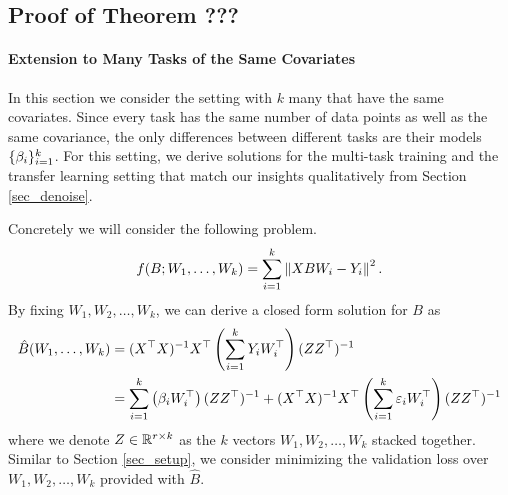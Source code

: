 \subsection{Proof of Theorem ???}

\paragraph{Extension to Many Tasks of the Same Covariates}

In this section we consider the setting with $k$ many that have the same covariates.
Since every task has the same number of data points as well as the same covariance, the only differences between different tasks are their models $\{\beta_i\}_{i=1}^k$.
For this setting, we derive solutions for the multi-task training and the transfer learning setting that match our insights qualitatively from Section \ref{sec_denoise}.

Concretely we will consider the following problem.
\begin{align}
	f(B; W_1, \dots, W_k) = \sum_{i=1}^k \left\| X B W_i - Y_i \right\|^2. \label{eq_mtl_same_cov}
\end{align}
By fixing $W_1, W_2, \dots, W_k$, we can derive a closed form solution for $B$ as
\begin{align*}
	\hat{B}(W_1, \dots, W_k) &= (X^{\top}X)^{-1} X^{\top} \left({\sum_{i=1}^k Y_i W_i^{\top}}\right) (Z Z^{\top})^{-1} \\
	&= \sum_{i=1}^k \left({\beta_i W_i^{\top}}\right) (ZZ^{\top})^{-1} + (X^{\top}X)^{-1}X^{\top} \left({\sum_{i=1}^k \varepsilon_i W_i^{\top}}\right) (ZZ^{\top})^{-1}
\end{align*}
where we denote $Z\in\mathbb{R}^{r\times k}$ as the $k$ vectors $W_1, W_2, \dots, W_k$ stacked together.
Similar to Section \ref{sec_setup}, we consider minimizing the validation loss over $W_1, W_2, \dots, W_k$ provided with $\hat{B}$.

